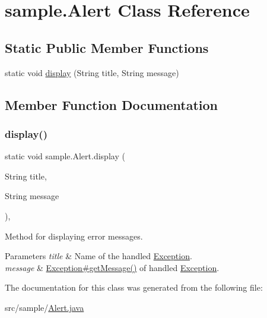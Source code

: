 \hypertarget{classsample_1_1_alert}{}\section{sample.\+Alert Class Reference}
\label{classsample_1_1_alert}
\subsection*{Static Public Member Functions}
\begin{DoxyCompactItemize}
\item 
static void \mbox{\hyperlink{classsample_1_1_alert_a56b2f1e797e0f5f4fff8493b91ab33c4}{display}} (String title, String message)
\end{DoxyCompactItemize}


\subsection{Member Function Documentation}
\mbox{\label{classsample_1_1_alert_a56b2f1e797e0f5f4fff8493b91ab33c4}} 
\subsubsection{\texorpdfstring{display()}{display()}}
{\footnotesize\ttfamily static void sample.\+Alert.\+display (\begin{DoxyParamCaption}\item[{String}]{title,  }\item[{String}]{message }\end{DoxyParamCaption})\hspace{0.3cm}{\ttfamily [inline]}, {\ttfamily [static]}}

Method for displaying error messages.


\begin{DoxyParams}{Parameters}
{\em title} & Name of the handled \mbox{\hyperlink{}{Exception}}. \\
\hline
{\em message} & \mbox{\hyperlink{}{Exception\#get\+Message()}} of handled \mbox{\hyperlink{}{Exception}}. \\
\hline
\end{DoxyParams}


The documentation for this class was generated from the following file\+:\begin{DoxyCompactItemize}
\item 
src/sample/\mbox{\hyperlink{_alert_8java}{Alert.\+java}}\end{DoxyCompactItemize}
